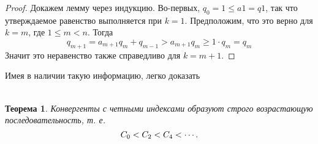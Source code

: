\documentclass[a4paper,12pt]{article}
\newtheorem{theorem}{Теорема}
\begin{document}
\begin{proof} Докажем лемму через индукцию. Во-первых, $q_0=1\leq a 1=q1$, так что утверждаемое равенство выполняется при $k=1$. Предположим, что это верно для $k=m$, где $1\leq m < n$. Тогда 
\[q_{m+1} = a_{m+1} q_m + q_{m-1} > a_{m+1} q_m \geq 1\cdotp q_m = q_m\]
Значит это неравенство также справедливо для $k = m+1.$ \end{proof}
\indent Имея в наличии такую информацию, легко доказать\\\\
\begin{theorem} Конвергенты с четными индексами образуют строго возрастающую последовательность, т. е.
\[C_0  < C_2 < C_4 < \cdots\ldotp\] \end{theorem}
\end{document}
